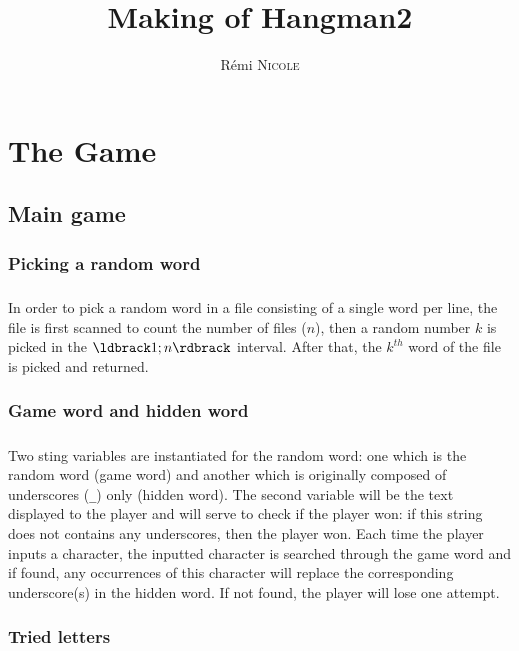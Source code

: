 \documentclass{report}
\author{Rémi \textsc{Nicole}}
\title{Making of Hangman2}
\date{}
\begin{document}
\maketitle

\chapter{The Game}

\section{Main game}

\subsection{Picking a random word}

\paragraph{} In order to pick a random word in a file consisting of a single
word per line, the file is first scanned to count the number of files ($n$),
then a random number $k$ is picked in the $\ldbrack1;n\rdbrack$ interval.
After that, the $k^{th}$ word of the file is picked and returned.

\subsection{Game word and hidden word}

\paragraph{} Two sting variables are instantiated for the random word: one
which is the random word (game word) and another which is originally composed
of underscores (\texttt{\_}) only (hidden word). The second variable will be
the text displayed to the player and will serve to check if the player won: if
this string does not contains any underscores, then the player won. Each time
the player inputs a character, the inputted character is searched through the
game word and if found, any occurrences of this character will replace the
corresponding underscore(s) in the hidden word. If not found, the player will
lose one attempt.

\subsection{Tried letters}
\end{document}
